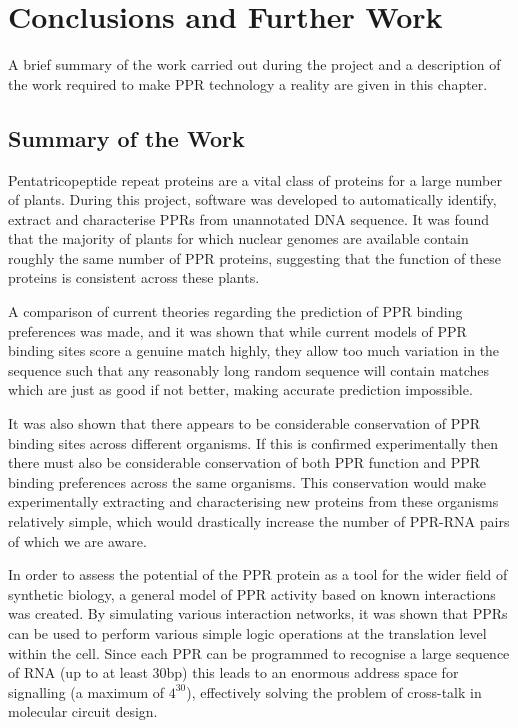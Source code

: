 
\chapter{Conclusions and Further Work}
\label{chap:Conclusions} 

\lettrine{A}{} brief summary of the work carried out during the project and a 
description of the work required to make PPR technology a reality are given in 
this chapter.

\section{Summary of the Work}

Pentatricopeptide repeat proteins are a vital class of proteins for a large
number of plants.
During this project, software was developed to automatically identify, extract 
and characterise PPRs from unannotated DNA sequence.
It was found that the majority of plants for which nuclear genomes are 
available contain roughly the same number of PPR proteins, suggesting that the
function of these proteins is consistent across these plants.

A comparison of current theories regarding the prediction of PPR binding
preferences was made, and it was shown that while current models of PPR binding
sites score a genuine match highly, they allow too much variation in the
sequence such that any reasonably long random sequence will contain matches 
which are just as good if not better, making accurate prediction impossible.

It was also shown that there appears to be considerable conservation of PPR 
binding sites across different organisms.
If this is confirmed experimentally then there must also be considerable 
conservation of both PPR function and PPR binding preferences across the same 
organisms.
This conservation would make experimentally extracting and characterising new
proteins from these organisms relatively simple, which would drastically 
increase the number of PPR-RNA pairs of which we are aware.

In order to assess the potential of the PPR protein as a tool for the wider
field of synthetic biology, a general model of PPR activity based on known 
interactions was created.
By simulating various interaction networks, it was shown that PPRs can be 
used to perform various simple logic operations at the translation level within
the cell.
Since each PPR can be programmed to recognise a large sequence of RNA (up to at
least $30$bp) this leads to an enormous address space for signalling (a maximum
of $4^{30}$), effectively solving the problem of cross-talk in molecular 
circuit design.

